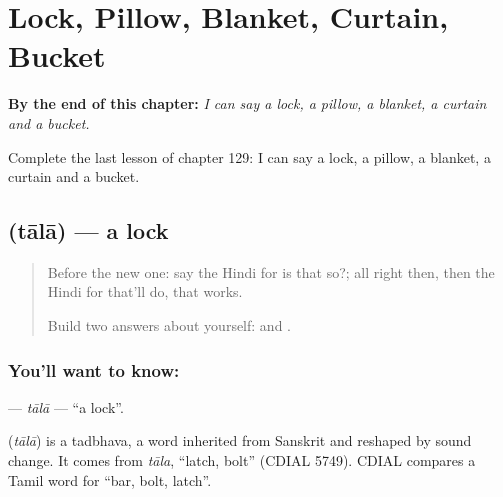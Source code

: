 
\chapter{Lock, Pillow, Blanket, Curtain, Bucket}
\label{ch:hi-lock-pillow-blanket-curtain-bucket}

\begin{chapteropening}
\textbf{By the end of this chapter:} \emph{I can say a lock, a pillow, a blanket, a curtain and a bucket.}

Complete the last lesson of chapter 129: I can say a lock, a pillow, a blanket, a curtain and a bucket.
\end{chapteropening}

\section[\texorpdfstring{\hi{ताला} (tālā)}{ताला (tālā)}]{ (tālā) — a lock}

\label{lesson:HI-C129-tala}



\begin{quote}
Before the new one: say the Hindi for is that so?; all right then, then the Hindi for that'll do, that works.

Build two answers about yourself: \textbf{   } and \textbf{    }.
\end{quote}

\subsection*{You'll want to know: }
\textbf{} — \emph{tālā} — \textquotedblleft{}a lock\textquotedblright{}.

\begin{cousinweb}
\textbf{} (\emph{tālā}) is a tadbhava, a word inherited from Sanskrit and reshaped by sound change. It comes from \emph{tāla}, \textquotedblleft{}latch, bolt\textquotedblright{} (CDIAL 5749). CDIAL compares a Tamil word for \textquotedblleft{}bar, bolt, latch\textquotedblright{}.
\end{cousinweb}

